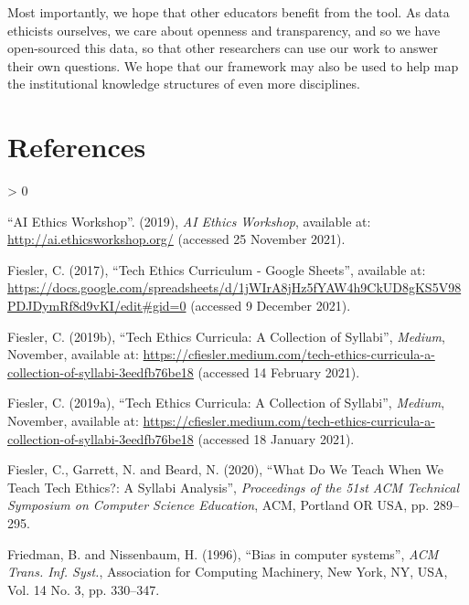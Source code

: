 \documentclass[
]{article}
\newlength{\cslhangindent}
\newenvironment{CSLReferences}[2] %
 {%
  \setlength{\parindent}{0pt}
  \ifodd #1 \everypar{\setlength{\hangindent}{\cslhangindent}}\ignorespaces\fi
  \ifnum #2 > 0
  \setlength{\parskip}{#2\baselineskip}
  \fi
 }%
 {}
\begin{document}
Most importantly, we hope that other educators benefit from the tool. As
data ethicists ourselves, we care about openness and transparency, and
so we have open-sourced this data, so that other researchers can use our
work to answer their own questions. We hope that our framework may also
be used to help map the institutional knowledge structures of even more
disciplines.

\hypertarget{references}{%
\section{References}\label{references}}

\hypertarget{refs}{}
\begin{CSLReferences}{1}{0}
\leavevmode\hypertarget{ref-ai_ethics}{}%
{``{AI} {Ethics} {Workshop}''}. (2019), \emph{AI Ethics Workshop},
available at: \url{http://ai.ethicsworkshop.org/} (accessed 25 November
2021).

\leavevmode\hypertarget{ref-fieslerTechEthicsCurriculum2017}{}%
Fiesler, C. (2017), {``Tech {Ethics} {Curriculum} - {Google}
{Sheets}''}, available at:
\url{https://docs.google.com/spreadsheets/d/1jWIrA8jHz5fYAW4h9CkUD8gKS5V98PDJDymRf8d9vKI/edit\#gid=0}
(accessed 9 December 2021).

\leavevmode\hypertarget{ref-fiesler_tech_2019}{}%
Fiesler, C. (2019b), {``Tech {Ethics} {Curricula}: {A} {Collection} of
{Syllabi}''}, \emph{Medium}, November, available at:
\url{https://cfiesler.medium.com/tech-ethics-curricula-a-collection-of-syllabi-3eedfb76be18}
(accessed 14 February 2021).

\leavevmode\hypertarget{ref-fieslerTechEthicsCurricula2019}{}%
Fiesler, C. (2019a), {``Tech {Ethics} {Curricula}: {A} {Collection} of
{Syllabi}''}, \emph{Medium}, November, available at:
\url{https://cfiesler.medium.com/tech-ethics-curricula-a-collection-of-syllabi-3eedfb76be18}
(accessed 18 January 2021).

\leavevmode\hypertarget{ref-fieslerWhatWeTeach2020}{}%
Fiesler, C., Garrett, N. and Beard, N. (2020), {``What {Do} {We} {Teach}
{When} {We} {Teach} {Tech} {Ethics}?: {A} {Syllabi} {Analysis}''},
\emph{Proceedings of the 51st {ACM} {Technical} {Symposium} on
{Computer} {Science} {Education}}, ACM, Portland OR USA, pp. 289--295.

\leavevmode\hypertarget{ref-nissenbaum1996}{}%
Friedman, B. and Nissenbaum, H. (1996), {``Bias in computer systems''},
\emph{ACM Trans. Inf. Syst.}, Association for Computing Machinery, New
York, NY, USA, Vol. 14 No. 3, pp. 330--347.


\end{CSLReferences}
\end{document}
